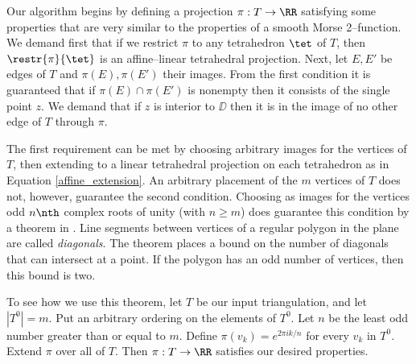 Our algorithm begins by defining a projection $\pi:T\to\RR$ satisfying some properties that are very similar to the properties of a smooth Morse 2--function.
We demand first that if we restrict $\pi$ to any tetrahedron $\tet$ of $T$, then $\restr{\pi}{\tet}$ is an affine--linear tetrahedral projection.
Next, let $E,E'$ be edges of $T$ and $\pi(E),\pi(E')$ their images.
From the first condition it is guaranteed that if $\pi(E)\cap\pi(E')$ is nonempty then it consists of the single point $z$.
We demand that if $z$ is interior to $\DD$ then it is in the image of no other edge of $T$ through $\pi$.

The first requirement can be met by choosing arbitrary images for the vertices of $T$, then extending to a linear tetrahedral projection on each tetrahedron as in Equation \ref{affine_extension}.
An arbitrary placement of the $m$ vertices of $T$ does not, however, guarantee the second condition.
Choosing as images for the vertices odd $n\nth$ complex roots of unity (with $n\geq m$) does guarantee this condition by a theorem in \cite{PoonRub98}.
Line segments between vertices of a regular polygon in the plane are called \emph{diagonals}.
The theorem places a bound on the number of diagonals that can intersect at a point.
If the polygon has an odd number of vertices, then this bound is two.

To see how we use this theorem, let $T$ be our input triangulation, and let $|T^0|=m$.
Put an arbitrary ordering on the elements of $T^0$.
Let $n$ be the least odd number greater than or equal to $m$.
Define $\pi(v_k)=e^{2\pi i k/n}$ for every $v_k$ in $T^0$.
Extend $\pi$ over all of $T$.
Then $\pi:T\to\RR$ satisfies our desired properties.
